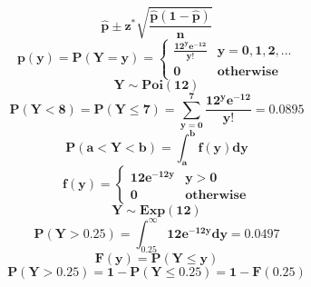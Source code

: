 \documentclass[12pt,portrait,semhelv,semrot]{article}
\begin{document}
{{$$\boldsymbol{\hat{p}\pm z^{*} \sqrt{\frac{\hat{p}(1-\hat{p})}{n}}}$$
$$\boldsymbol{p(y) = P(Y=y) = \begin{cases} \frac{12^y e^{-12}}{y!} & y = 0, 1, 2, ... \\ 0 & \mbox{otherwise}\end{cases}}$$
$$\boldsymbol{Y\sim Poi(12)}$$
$$\boldsymbol{P(Y<8) = P(Y\leq 7) = \sum_{y=0}^{7}\frac{12^y e^{-12}}{y!}} = 0.0895$$
$$\boldsymbol{P(a < Y < b) = \int_a^b f(y)dy}$$
$$\boldsymbol{f(y) = \begin{cases} 12e^{-12y} & y > 0 \\ 0 & \mbox{otherwise}\end{cases}}$$
$$\boldsymbol{Y\sim Exp(12)}$$
$$\boldsymbol{P(Y > 0.25) = \int_{0.25}^{\infty} 12e^{-12y}dy = 0.0497}$$
$$\boldsymbol{F(y) = P(Y\leq y)}$$
$$\boldsymbol{P(Y > 0.25) = 1-P(Y\leq 0.25) = 1 - F(0.25)}$$
}}
\end{document}

